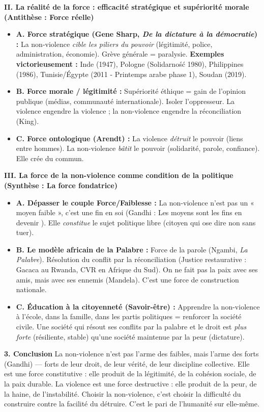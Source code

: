 \documentclass[11pt]{article}
\newcommand{\cle}[1]{{\popxbold\color{popdark}#1}}
\begin{document}
\begin{exoresolu}
\textbf{II. La réalité de la force : efficacité stratégique et supériorité morale (Antithèse : Force réelle)}
\begin{itemize}
    \item \textbf{A. Force stratégique (Gene Sharp, \emph{De la dictature à la démocratie}) :} La non-violence \emph{cible les piliers du pouvoir} (légitimité, police, administration, économie). Grève générale = paralysie. \textbf{Exemples victorieusement :} Inde (1947), Pologne (Solidarność 1980), Philippines (1986), Tunisie/Égypte (2011 - Printemps arabe phase 1), Soudan (2019).
    \item \textbf{B. Force morale / légitimité :} \cle{Supériorité éthique} = gain de l'opinion publique (médias, communauté internationale). Isoler l'oppresseur. \guillemotleft La violence engendre la violence ; la non-violence engendre la réconciliation \guillemotright (King).
    \item \textbf{C. Force ontologique (Arendt) :} La violence \emph{détruit} le pouvoir (liens entre hommes). La non-violence \emph{bâtit} le pouvoir (solidarité, parole, confiance). Elle crée du \cle{commun}.
\end{itemize}

\textbf{III. La force de la non-violence comme \cle{condition de la politique} (Synthèse : La force fondatrice)}
\begin{itemize}
    \item \textbf{A. Dépasser le couple Force/Faiblesse :} La non-violence n'est pas un « moyen faible », c'est une \cle{fin en soi} (Gandhi : \guillemotleft Les moyens sont les fins en devenir \guillemotright). Elle \emph{constitue} le sujet politique libre (citoyen qui ose dire non sans tuer).
    \item \textbf{B. Le modèle africain de la \cle{Palabre} :} Force de la \cle{parole} (Ngambi, \emph{La Palabre}). Résolution du conflit par la \cle{réconciliation} (Justice restaurative : Gacaca au Rwanda, CVR en Afrique du Sud). \guillemotleft On ne fait pas la paix avec ses amis, mais avec ses ennemis \guillemotright (Mandela). C'est une \cle{force de construction nationale}.
    \item \textbf{C. Éducation à la citoyenneté (Savoir-être) :} Apprendre la non-violence à l'école, dans la famille, dans les partis politiques = \cle{renforcer la société civile}. Une société qui résout ses conflits par la palabre et le droit est \emph{plus forte} (résiliente, stable) qu'une société maintenue par la peur (dictature).
\end{itemize}

\textbf{3. Conclusion}
La non-violence n'est pas l'arme des faibles, mais l'\cle{arme des forts} (Gandhi) — forts de leur droit, de leur vérité, de leur discipline collective. Elle est une \cle{force constitutive} : elle produit de la légitimité, de la cohésion sociale, de la paix durable. La violence est une \cle{force destructive} : elle produit de la peur, de la haine, de l'instabilité. Choisir la non-violence, c'est choisir la \cle{difficulté du construire} contre la \cle{facilité du détruire}. C'est le pari de l'humanité sur elle-même.
\end{exoresolu}
\end{document}
